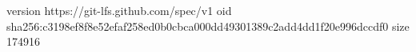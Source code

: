 version https://git-lfs.github.com/spec/v1
oid sha256:c3198ef8f8e52efaf258ed0b0cbca000dd49301389c2add4dd1f20e996dccdf0
size 174916
